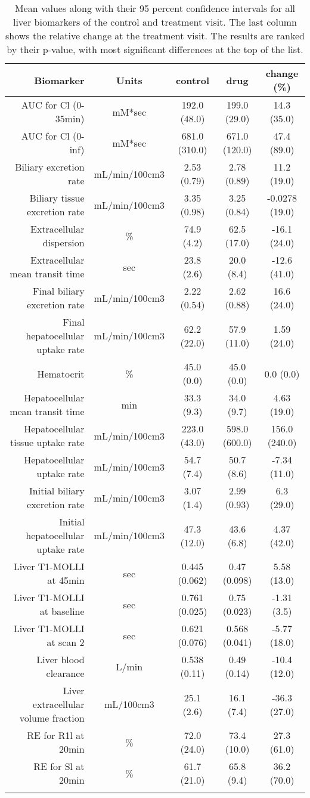 \documentclass{epflreport}%
\begin{document}
\begin{longtable}{rcccc}%
\hline%
Biomarker&Units&control&drug&change (\%)\\%
\hline%
AUC for Cl (0{-}35min)&mM*sec&192.0 (48.0) &199.0 (29.0) &14.3 (35.0) \\%
AUC for Cl (0{-}inf)&mM*sec&681.0 (310.0) &671.0 (120.0) &47.4 (89.0) \\%
Biliary excretion rate&mL/min/100cm3&2.53 (0.79) &2.78 (0.89) &11.2 (19.0) \\%
Biliary tissue excretion rate&mL/min/100cm3&3.35 (0.98) &3.25 (0.84) &{-}0.0278 (19.0) \\%
Extracellular dispersion&\%&74.9 (4.2) &62.5 (17.0) &{-}16.1 (24.0) \\%
Extracellular mean transit time&sec&23.8 (2.6) &20.0 (8.4) &{-}12.6 (41.0) \\%
Final biliary excretion rate&mL/min/100cm3&2.22 (0.54) &2.62 (0.88) &16.6 (24.0) \\%
Final hepatocellular uptake rate&mL/min/100cm3&62.2 (22.0) &57.9 (11.0) &1.59 (24.0) \\%
Hematocrit&\%&45.0 (0.0) &45.0 (0.0) &0.0 (0.0) \\%
Hepatocellular mean transit time&min&33.3 (9.3) &34.0 (9.7) &4.63 (19.0) \\%
Hepatocellular tissue uptake rate&mL/min/100cm3&223.0 (43.0) &598.0 (600.0) &156.0 (240.0) \\%
Hepatocellular uptake rate&mL/min/100cm3&54.7 (7.4) &50.7 (8.6) &{-}7.34 (11.0) \\%
Initial biliary excretion rate&mL/min/100cm3&3.07 (1.4) &2.99 (0.93) &6.3 (29.0) \\%
Initial hepatocellular uptake rate&mL/min/100cm3&47.3 (12.0) &43.6 (6.8) &4.37 (42.0) \\%
Liver T1{-}MOLLI at 45min&sec&0.445 (0.062) &0.47 (0.098) &5.58 (13.0) \\%
Liver T1{-}MOLLI at baseline&sec&0.761 (0.025) &0.75 (0.023) &{-}1.31 (3.5) \\%
Liver T1{-}MOLLI at scan 2&sec&0.621 (0.076) &0.568 (0.041) &{-}5.77 (18.0) \\%
Liver blood clearance&L/min&0.538 (0.11) &0.49 (0.14) &{-}10.4 (12.0) \\%
Liver extracellular volume fraction&mL/100cm3&25.1 (2.6) &16.1 (7.4) &{-}36.3 (27.0) \\%
RE for R1l at 20min&\%&72.0 (24.0) &73.4 (10.0) &27.3 (61.0) \\%
RE for Sl at 20min&\%&61.7 (21.0) &65.8 (9.4) &36.2 (70.0) \\%
\hline%
\caption{Mean values along with their 95 percent confidence intervals for all liver biomarkers of the control and treatment visit. The last column shows the relative change at the treatment visit. The results are ranked by their p-value, with most significant differences at the top of the list.} \\%
\end{longtable}%
\clearpage%
\end{document}
